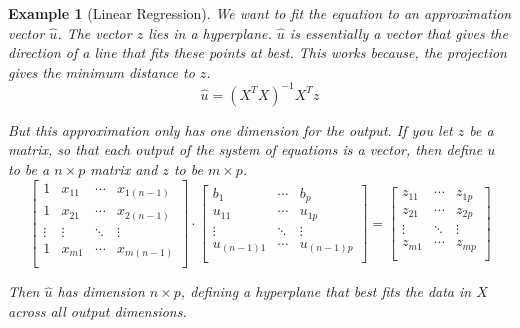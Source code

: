 \documentclass{book}
\newtheorem{example}{Example}[chapter]
\begin{document}
\begin{example}[Linear Regression]
    We want to fit the equation to an approximation vector $\hat u$. The vector $z$
    lies in a hyperplane. $\hat u$ is essentially a vector that gives the direction
    of a line that fits these points at best. This works because, the projection
    gives the minimum distance to $z$.
    \begin{equation}
        \hat u = {\left(X^{T}X\right)}^{-1}X^{T}z
    \end{equation}

    But this approximation only has one dimension for the output. If you let $z$ be
    a matrix, so that each output of the system of equations is a vector, then
    define $u$ to be a $n\times p$ matrix and $z$ to be $m\times p$.
    \begin{equation}
        \left[
            \begin{matrix}
                1      & x_{11} & \cdots & x_{1(n-1)} \\
                1      & x_{21} & \cdots & x_{2(n-1)} \\
                \vdots & \vdots & \ddots & \vdots     \\
                1      & x_{m1} & \cdots & x_{m(n-1)} \\
            \end{matrix}
            \right]\cdot \left[
            \begin{matrix}
                b_1        & \cdots & b_p        \\
                u_{11}     & \cdots & u_{1p}     \\
                \vdots     & \ddots & \vdots     \\
                u_{(n-1)1} & \cdots & u_{(n-1)p} \\
            \end{matrix}
            \right] = \left[
            \begin{matrix}
                z_{11} & \cdots & z_{1p} \\
                z_{21} & \cdots & z_{2p} \\
                \vdots & \ddots & \vdots \\
                z_{m1} & \cdots & z_{mp} \\
            \end{matrix}
            \right]
    \end{equation}

    Then $\hat u$ has dimension $n \times p$, defining a hyperplane that best fits
    the data in $X$ across all output dimensions.


\end{example}
\end{document}
